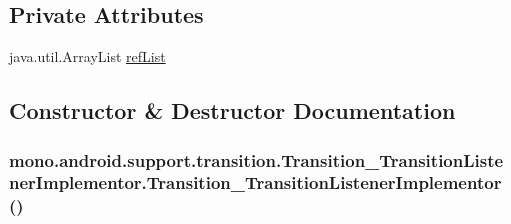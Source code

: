 \subsection*{Private Attributes}
\begin{CompactItemize}
\item 
java.util.ArrayList \hyperlink{classmono_1_1android_1_1support_1_1transition_1_1_transition___transition_listener_implementor_662563a5cc609dd3b1dbc51ad2804725}{refList}
\end{CompactItemize}


\subsection{Constructor \& Destructor Documentation}
\hypertarget{classmono_1_1android_1_1support_1_1transition_1_1_transition___transition_listener_implementor_d565bbddbf2888ed21a56a2f8a468bad}{
\subsubsection[{Transition\_\-TransitionListenerImplementor}]{\setlength{\rightskip}{0pt plus 5cm}mono.android.support.transition.Transition\_\-TransitionListenerImplementor.Transition\_\-TransitionListenerImplementor ()}}
\label{classmono_1_1android_1_1support_1_1transition_1_1_transition___transition_listener_implementor_d565bbddbf2888ed21a56a2f8a468bad}





